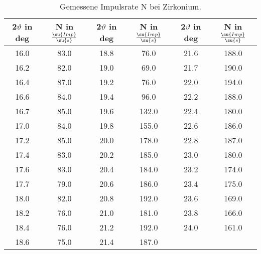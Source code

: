 \begin{table}
  \centering
  \caption{Gemessene Impulsrate N bei Zirkonium.}
  \label{tab:Zirkonium}
  \begin{tabular}{c c | c c | c c}
    \toprule
    2$\vartheta$ in deg & N in $\frac{\su{Imp}}{\su{s}}$ & 2$\vartheta$ in deg &
    N in $\frac{\su{Imp}}{\su{s}}$ & 2$\vartheta$ in deg & N in $\frac{\su{Imp}}{\su{s}}$ \\
    \midrule
    16.0 & 83.0 & 18.8 & 76.0  & 21.6 & 188.0 \\
    16.2 & 82.0 & 19.0 & 69.0  & 21.7 & 190.0 \\
    16.4 & 87.0 & 19.2 & 76.0  & 22.0 & 194.0 \\
    16.6 & 84.0 & 19.4 & 96.0  & 22.2 & 188.0 \\
    16.7 & 85.0 & 19.6 & 132.0 & 22.4 & 180.0 \\
    17.0 & 84.0 & 19.8 & 155.0 & 22.6 & 186.0 \\
    17.2 & 85.0 & 20.0 & 178.0 & 22.8 & 187.0 \\
    17.4 & 83.0 & 20.2 & 185.0 & 23.0 & 180.0 \\
    17.6 & 83.0 & 20.4 & 184.0 & 23.2 & 174.0 \\
    17.7 & 79.0 & 20.6 & 186.0 & 23.4 & 175.0 \\
    18.0 & 82.0 & 20.8 & 192.0 & 23.6 & 169.0 \\
    18.2 & 76.0 & 21.0 & 181.0 & 23.8 & 166.0 \\
    18.4 & 76.0 & 21.2 & 192.0 & 24.0 & 161.0 \\
    18.6 & 75.0 & 21.4 & 187.0 &      &       \\
    \bottomrule
  \end{tabular}
\end{table}
